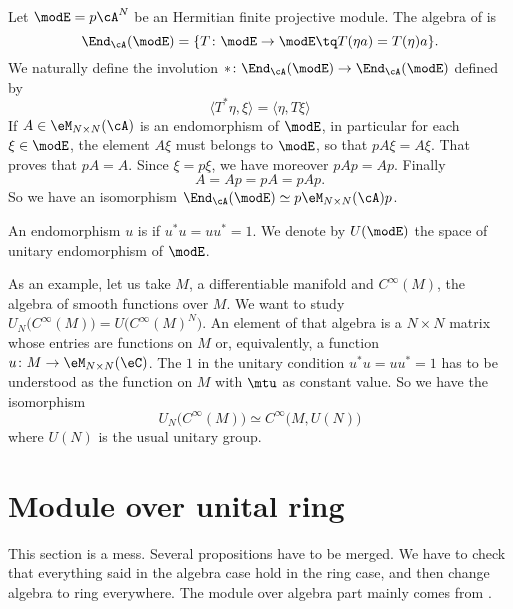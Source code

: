 Let $\modE=p\cA^N$ be an Hermitian finite projective module. The algebra of  is
\[
	\End_{\cA}(\modE)=\{ T\colon \modE\to \modE\tq T(\eta a)=T(\eta)a \}.
\]
We naturally define the involution $*\colon \End_{\cA}(\modE)\to \End_{\cA}(\modE)$ defined by
\begin{equation}
	\langle T^*\eta, \xi\rangle =\langle \eta, T\xi\rangle
\end{equation}
If $A\in\eM_{N\times N}(\cA)$ is an endomorphism of $\modE$, in particular for each $\xi\in\modE$, the element $A\xi$ must belongs to $\modE$, so that $pA\xi=A\xi$. That proves that $pA=A$. Since $\xi=p\xi$, we have moreover $pAp=Ap$. Finally
\[
	A=Ap=pA=pAp.
\]
So we have an isomorphism $\End_{\cA}(\modE)\simeq p\eM_{N\times N}(\cA)p$.

\begin{definition}
	An endomorphism $u$ is  if $u^*u=uu^*=1$. We denote by $U(\modE)$ the space of unitary endomorphism of $\modE$.
\end{definition}

As an example, let us take $M$, a differentiable manifold and $ C^{\infty}(M)$, the algebra of smooth functions over $M$. We want to study $U_N\big(  C^{\infty}(M) \big)=U\big(  C^{\infty}(M)^N \big)$. An element of that algebra is a $N\times N$ matrix whose entries are functions on $M$ or, equivalently, a function $u\colon M\to \eM_{N\times N}(\eC)$. The $1$ in the unitary condition $u^*u=uu^*=1$ has to be understood as the function on $M$ with $\mtu$ as constant value. So we have the isomorphism
\[
	U_N\big(  C^{\infty}(M) \big)\simeq C^{\infty}\big( M,U(N) \big)
\]
where $U(N)$ is the usual unitary group.


\section{Module over unital ring}
\label{SecModUnitalAnneau}

\begin{probleme}
	This section is a mess. Several propositions have to be merged. We have to check that everything said in the algebra case hold in the ring case, and then change algebra to ring everywhere. The module over algebra part mainly comes from \cite{Landi}.
\end{probleme}

